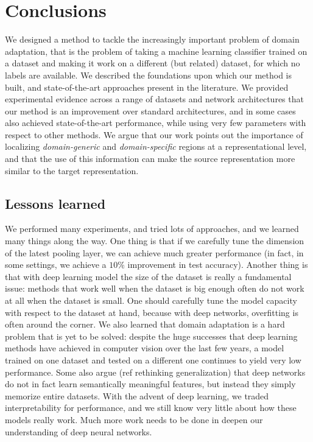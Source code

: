 \documentclass[../main.tex]{subfiles}
\begin{document}
    \chapter{Conclusions}
    We designed a method to tackle the increasingly important problem of domain adaptation,
    that is the problem of taking a machine learning classifier trained on a dataset and making it work
    on a different (but related) dataset, for which no labels are available. We described the foundations
    upon which our method is built, and state-of-the-art approaches present in the literature. We provided
    experimental evidence across a range of datasets and network architectures that our method is an
    improvement over standard architectures, and in some cases also achieved state-of-the-art performance,
    while using very few parameters with respect to other methods. We argue that our work points out the
    importance of localizing \textit{domain-generic} and \textit{domain-specific} regions at a representational
    level, and that the use of this information can make the source representation more similar to the target
    representation.

    \section{Lessons learned}
    We performed many experiments, and tried lots of approaches, and we learned many things along the way.
    One thing is that if we carefully tune the dimension of the latest pooling layer, we can achieve much
    greater performance (in fact, in some settings, we achieve a $10\%$ improvement in test accuracy).
    Another thing is that with deep learning model the size of the dataset is really a fundamental issue:
    methods that work well when the dataset is big enough often do not work at all when the dataset is
    small. One should carefully tune the model capacity with respect to the dataset at hand, because with
    deep networks, overfitting is often around the corner.
    We also learned that domain adaptation is a hard problem that is yet to be solved: despite the huge
    successes that deep learning methods have achieved in computer vision over the last few years, a model
    trained on one dataset and tested on a different one continues to yield very low performance. Some
    also argue (ref rethinking generalization) that deep networks do not in fact learn semantically
    meaningful features, but instead they simply memorize entire datasets. With the advent of deep learning,
    we traded interpretability for performance, and we still know very little about how these models really work.
    Much more work needs to be done in deepen our understanding of deep neural networks.
\end{document}
